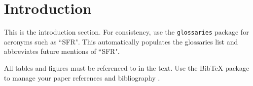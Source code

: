 \section{Introduction}

This is the introduction section. For consistency, use the
\texttt{glossaries} package for acronyms such as ``\gls{SFR}".
This automatically populates the glossaries list and abbreviates future
mentions of ``\gls{SFR}".

All tables and figures must be referenced to in the text.
Use the BibTeX package to manage your paper references and bibliography
\cite{huff_extensions_2014}.
